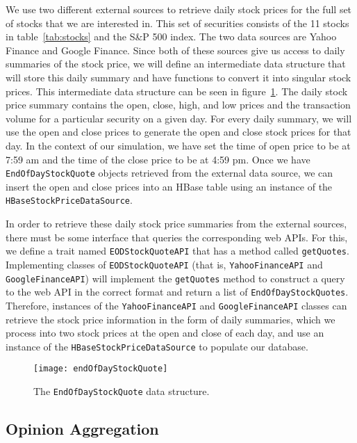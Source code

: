 We use two different external sources to retrieve daily stock prices for the full set of stocks that we are interested in.
This set of securities consists of the 11 stocks in table~\ref{tab:stocks} and the S\&P 500 index.
The two data sources are Yahoo Finance and Google Finance.
Since both of these sources give us access to daily summaries of the stock price, we will define an intermediate data structure that will store this daily summary and have functions to convert it into singular stock prices.
This intermediate data structure can be seen in figure~\ref{endOfDayStockQuote}.
The daily stock price summary contains the open, close, high, and low prices and the transaction volume for a particular security on a given day.
For every daily summary, we will use the open and close prices to generate the open and close stock prices for that day.
In the context of our simulation, we have set the time of open price to be at 7:59 am and the time of the close price to be at 4:59 pm.
Once we have \texttt{EndOfDayStockQuote} objects retrieved from the external data source, we can insert the open and close prices into an HBase table using an instance of the \texttt{HBaseStockPriceDataSource}.

In order to retrieve these daily stock price summaries from the external sources, there must be some interface that queries the corresponding web APIs.
For this, we define a trait named \texttt{EODStockQuoteAPI} that has a method called \texttt{getQuotes}.
Implementing classes of \texttt{EODStockQuoteAPI} (that is, \texttt{YahooFinanceAPI} and \texttt{GoogleFinanceAPI}) will implement the \texttt{getQuotes} method to construct a query to the web API in the correct format and return a list of \texttt{EndOfDayStockQuotes}.
Therefore, instances of the \texttt{YahooFinanceAPI} and \texttt{GoogleFinanceAPI} classes can retrieve the stock price information in the form of daily summaries, which we process into two stock prices at the open and close of each day, and use an instance of the \texttt{HBaseStockPriceDataSource} to populate our database.

\begin{figure}[h]
  \label{endOfDayStockQuote}
  \begin{center}
    \texttt{[image: endOfDayStockQuote]}
  \end{center}
  \caption{The \texttt{EndOfDayStockQuote} data structure.}
\end{figure}

\subsection{Opinion Aggregation}

